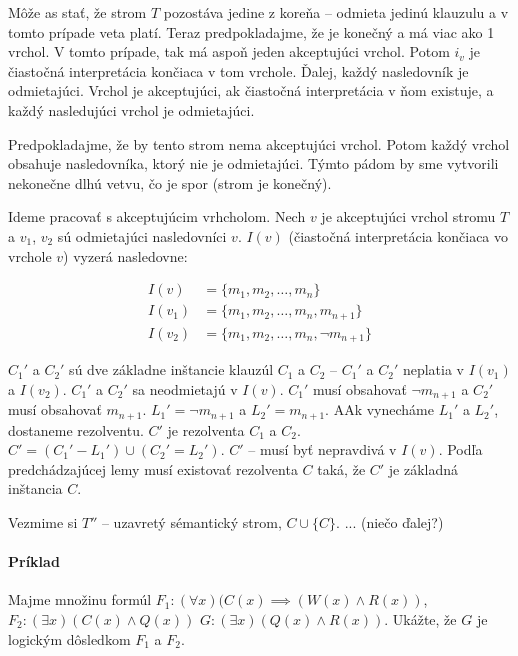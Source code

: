 \par Môže as stať, že strom $T$ pozostáva jedine z koreňa -- odmieta jedinú
klauzulu a v tomto prípade veta platí. Teraz predpokladajme, že je konečný a má
viac ako 1 vrchol. V tomto prípade, tak má aspoň jeden akceptujúci vrchol. Potom
$i_v$ je čiastočná interpretácia končiaca v tom vrchole. Ďalej, každý
nasledovník je odmietajúci. Vrchol je akceptujúci, ak čiastočná interpretácia v
ňom existuje, a každý nasledujúci vrchol je odmietajúci.

\par Predpokladajme, že by tento strom nema akceptujúci vrchol. Potom každý
vrchol obsahuje nasledovníka, ktorý nie je odmietajúci. Týmto pádom by sme
vytvorili nekonečne dlhú vetvu, čo je spor (strom je konečný).

\par Ideme pracovať s akceptujúcim vrhcholom. Nech $v$ je akceptujúci vrchol
stromu $T$ a $v_1$, $v_2$ sú odmietajúci nasledovníci $v$. $I(v)$ (čiastočná
interpretácia končiaca vo vrchole $v$) vyzerá nasledovne:

\begin{align*}
    I(v)    &= \{ m_1, m_2, \ldots, m_n \} \\
    I(v_1)  &= \{ m_1, m_2, \ldots, m_n, m_{n+1} \}  \\
    I(v_2)  &= \{ m_1, m_2, \ldots, m_n, \neg m_{n+1} \} 
\end{align*}

$C_1'$ a $C_2'$ sú dve základne inštancie klauzúl $C_1$ a $C_2$ -- $C_1'$ a
$C_2'$ neplatia v $I(v_1)$ a $I(v_2)$. $C_1'$ a $C_2'$ sa neodmietajú v $I(v)$.
$C_1'$ musí obsahovať $\neg m_{n+1}$ a $C_2'$ musí obsahovať $m_{n+1}$. $L_1' =
\neg m_{n+1}$ a $L_2' = m_{n+1}$. AAk vynecháme $L_1'$ a $L_2'$, dostaneme
rezolventu. $C'$ je rezolventa $C_1$ a $C_2$. $C' = (C_1' - L_1') \cup (C_2' =
L_2')$. $C'$ -- musí byť nepravdivá v $I(v)$. Podľa predchádzajúcej lemy musí
existovať rezolventa $C$ taká, že $C'$ je základná inštancia $C$.

\par Vezmime si $T''$ -- uzavretý sémantický strom, $C \cup \{C\}$. ... (niečo
ďalej?)



\paragraph{Príklad} Majme množinu formúl $F_1: (\forall x) (C(x) \implies (W(x)
\land R(x))$, $F_2: (\exists x)(C(x) \land Q(x))$ $G: (\exists x) (Q(x) \land
R(x))$. Ukážte, že $G$ je logickým dôsledkom $F_1$ a $F_2$.

